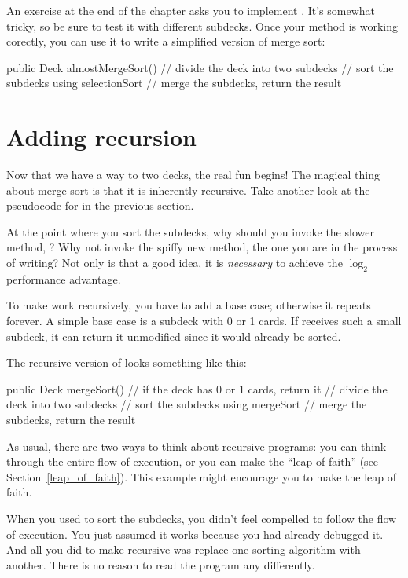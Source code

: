 An exercise at the end of the chapter asks you to implement .
It's somewhat tricky, so be sure to test it with different subdecks.
Once your  method is working corectly, you can use it to write a simplified version of merge sort:

\begin{code}
public Deck almostMergeSort() {
    // divide the deck into two subdecks
    // sort the subdecks using selectionSort
    // merge the subdecks, return the result
}
\end{code}


\section{Adding recursion}

Now that we have a way to  two decks, the real fun begins!
The magical thing about merge sort is that it is inherently recursive.
Take another look at the pseudocode for  in the previous section.

At the point where you sort the subdecks, why should you invoke the slower method, ?
Why not invoke the spiffy new  method, the one you are in the process of writing?
Not only is that a good idea, it is {\em necessary} to achieve the $\log_2$ performance advantage.

To make  work recursively, you have to add a base case; otherwise it repeats forever.
A simple base case is a subdeck with 0 or 1 cards.
If  receives such a small subdeck, it can return it unmodified since it would already be sorted.

The recursive version of  looks something like this:

\begin{code}
public Deck mergeSort() {
    // if the deck has 0 or 1 cards, return it
    // divide the deck into two subdecks
    // sort the subdecks using mergeSort
    // merge the subdecks, return the result
}
\end{code}


As usual, there are two ways to think about recursive programs: you can think through the entire flow of execution, or you can make the ``leap of faith'' (see Section~\ref{leap_of_faith}).
This example might encourage you to make the leap of faith.

When you used  to sort the subdecks, you didn't feel compelled to follow the flow of execution.
You just assumed it works because you had already debugged it.
And all you did to make  recursive was replace one sorting algorithm with another.
There is no reason to read the program any differently.

